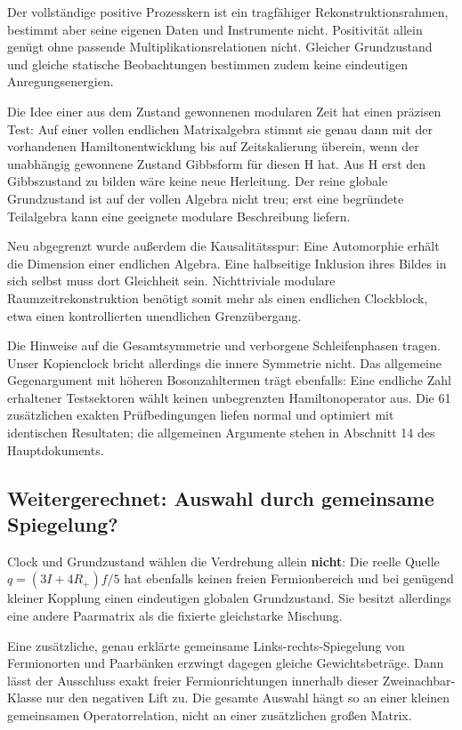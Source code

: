 \documentclass[
  ngerman,
  10pt,
  a4paper,
]{article}
\begin{document}
Der vollständige positive Prozesskern ist ein tragfähiger
Rekonstruktionsrahmen, bestimmt aber seine eigenen Daten und Instrumente
nicht. Positivität allein genügt ohne passende Multiplikationsrelationen
nicht. Gleicher Grundzustand und gleiche statische Beobachtungen
bestimmen zudem keine eindeutigen Anregungsenergien.

Die Idee einer aus dem Zustand gewonnenen modularen Zeit hat einen
präzisen Test: Auf einer vollen endlichen Matrixalgebra stimmt sie genau
dann mit der vorhandenen Hamiltonentwicklung bis auf Zeitskalierung
überein, wenn der unabhängig gewonnene Zustand Gibbsform für diesen H
hat. Aus H erst den Gibbszustand zu bilden wäre keine neue Herleitung.
Der reine globale Grundzustand ist auf der vollen Algebra nicht treu;
erst eine begründete Teilalgebra kann eine geeignete modulare
Beschreibung liefern.

Neu abgegrenzt wurde außerdem die Kausalitätsspur: Eine Automorphie
erhält die Dimension einer endlichen Algebra. Eine halbseitige Inklusion
ihres Bildes in sich selbst muss dort Gleichheit sein. Nichttriviale
modulare Raumzeitrekonstruktion benötigt somit mehr als einen endlichen
Clockblock, etwa einen kontrollierten unendlichen Grenzübergang.

Die Hinweise auf die Gesamtsymmetrie und verborgene Schleifenphasen
tragen. Unser Kopienclock bricht allerdings die innere Symmetrie nicht.
Das allgemeine Gegenargument mit höheren Bosonzahltermen trägt
ebenfalls: Eine endliche Zahl erhaltener Testsektoren wählt keinen
unbegrenzten Hamiltonoperator aus. Die 61 zusätzlichen exakten
Prüfbedingungen liefen normal und optimiert mit identischen Resultaten;
die allgemeinen Argumente stehen in Abschnitt 14 des Hauptdokuments.

\subsection{Weitergerechnet: Auswahl durch gemeinsame
Spiegelung?}\label{weitergerechnet-auswahl-durch-gemeinsame-spiegelung}

Clock und Grundzustand wählen die Verdrehung allein \textbf{nicht}: Die
reelle Quelle \(q=(3I+4R_+)f/5\) hat ebenfalls keinen freien
Fermionbereich und bei genügend kleiner Kopplung einen eindeutigen
globalen Grundzustand. Sie besitzt allerdings eine andere Paarmatrix als
die fixierte gleichstarke Mischung.

Eine zusätzliche, genau erklärte gemeinsame Links-rechts-Spiegelung von
Fermionorten und Paarbänken erzwingt dagegen gleiche Gewichtsbeträge.
Dann lässt der Ausschluss exakt freier Fermionrichtungen innerhalb
dieser Zweinachbar-Klasse nur den negativen Lift zu. Die gesamte Auswahl
hängt so an einer kleinen gemeinsamen Operatorrelation, nicht an einer
zusätzlichen großen Matrix.
\end{document}
